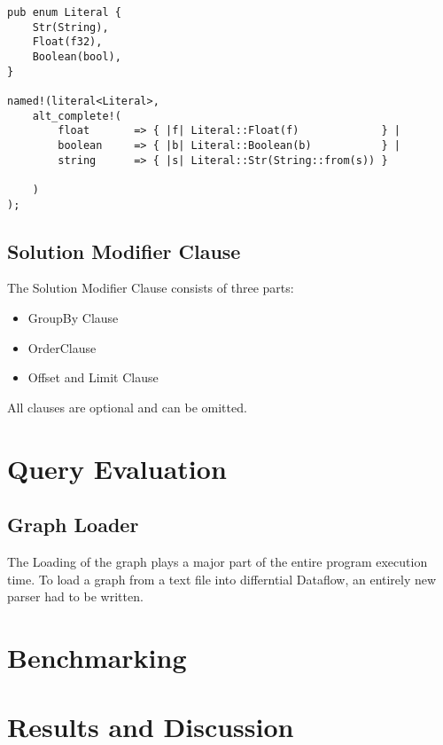 \documentclass[11pt,singlecolumn]{scrartcl}
\begin{document}
 \begin{lstlisting}
pub enum Literal {
    Str(String),
    Float(f32),
    Boolean(bool),
} 
 
named!(literal<Literal>,
    alt_complete!(
        float       => { |f| Literal::Float(f)             } |
        boolean     => { |b| Literal::Boolean(b)           } |
        string      => { |s| Literal::Str(String::from(s)) } 
            
    )
);
 \end{lstlisting}
 
 \clearpage
 
 \subsection{Solution Modifier Clause}
 
 The Solution Modifier Clause consists of three parts: 
  \begin{itemize} 
\item GroupBy Clause
\item OrderClause
\item Offset and Limit Clause
\end{itemize}
 All clauses are optional and can be omitted. 
 
\clearpage

\section{Query Evaluation}

\clearpage

\subsection{Graph Loader}
The Loading of the graph plays a major part of the entire program execution time. To load a graph from a text file into differntial Dataflow, an entirely new parser had to be written.
 
\clearpage

\section{Benchmarking}

\clearpage


\section{Results and Discussion}
\end{document}
